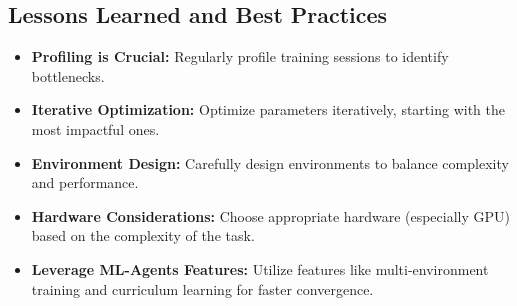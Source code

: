 \subsection{Lessons Learned and Best Practices}
\begin{itemize}
    \item \textbf{Profiling is Crucial:} Regularly profile training sessions to identify bottlenecks.
    \item \textbf{Iterative Optimization:} Optimize parameters iteratively, starting with the most impactful ones.
    \item \textbf{Environment Design:} Carefully design environments to balance complexity and performance.
    \item \textbf{Hardware Considerations:} Choose appropriate hardware (especially GPU) based on the complexity of the task.
    \item \textbf{Leverage ML-Agents Features:} Utilize features like multi-environment training and curriculum learning for faster convergence.
\end{itemize}